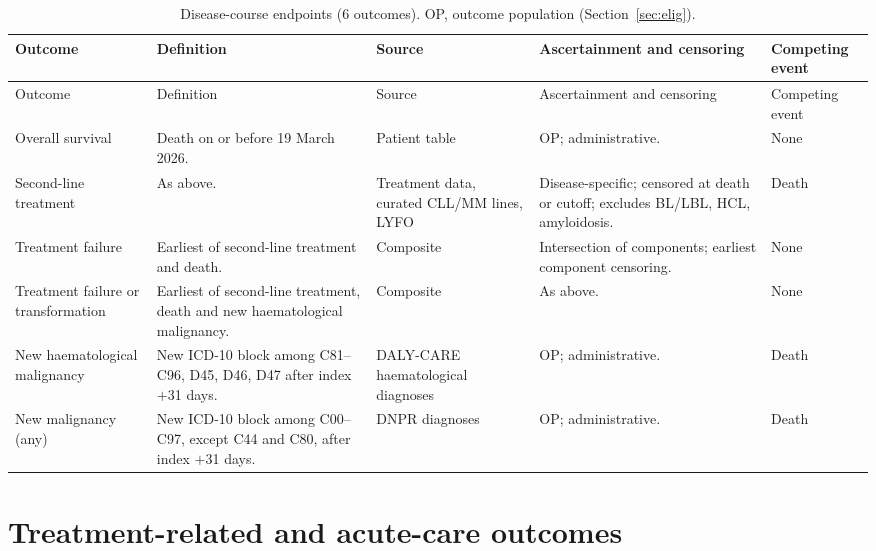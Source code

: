 \documentclass[10pt]{article}
\begin{document}
{\footnotesize\setlength{\tabcolsep}{3pt}
\begin{longtable}{L{3.0cm}L{5.5cm}L{2.5cm}L{3.3cm}L{1.6cm}}
\caption{Disease-course endpoints (6 outcomes). OP, outcome population
(Section~\ref{sec:elig}).}\label{tab:course}\\
\toprule
Outcome & Definition & Source & Ascertainment and censoring & Competing event\\
\midrule\endfirsthead
\toprule
Outcome & Definition & Source & Ascertainment and censoring & Competing event\\
\midrule\endhead
\bottomrule\endfoot
Overall survival & Death on or before 19 March 2026. & Patient table & OP; administrative. & None\\
Second-line treatment & As above. & Treatment data, curated CLL/MM lines, LYFO & Disease-specific; censored at death or cutoff; excludes BL/LBL, HCL, amyloidosis. & Death\\
Treatment failure & Earliest of second-line treatment and death. & Composite & Intersection of components; earliest component censoring. & None\\
Treatment failure or transformation & Earliest of second-line treatment, death and new haematological malignancy. & Composite & As above. & None\\
New haematological malignancy & New ICD-10 block among C81--C96, D45, D46, D47 after index $+$31 days. & DALY-CARE haematological diagnoses & OP; administrative. & Death\\
New malignancy (any) & New ICD-10 block among C00--C97, except C44 and C80, after index $+$31 days. & DNPR diagnoses & OP; administrative. & Death\\
\end{longtable}}

\section{Treatment-related and acute-care outcomes}\label{sec:outcomes}
\end{document}
